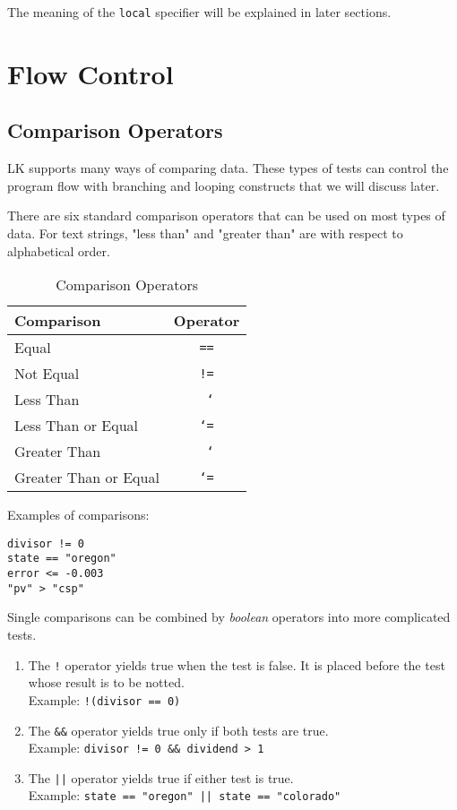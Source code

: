 \documentclass{article}
\newcommand\lt{\char`\<}
\newcommand\gt{\char`\>}
\begin{document}
The meaning of the \texttt{local} specifier will be explained in later sections.



\section{Flow Control}

\subsection{Comparison Operators}

LK supports many ways of comparing data.  These types of tests can control the program flow with branching and looping constructs that we will discuss later.

There are six standard comparison operators that can be used on most types of data.  For text strings, "less than" and "greater than" are with respect to alphabetical order.

\begin{table}[ht]
\begin{center}
\begin{tabular}{lc}
Comparison & Operator\\
\hline
Equal & \texttt{ == } \\
Not Equal & \texttt{ != }  \\
Less Than & \texttt{ \lt }  \\
Less Than or Equal & \texttt{ \lt= } \\
Greater Than & \texttt{ \gt } \\
Greater Than or Equal & \texttt{ \gt= } \\
\end{tabular}
\caption{Comparison Operators}
\label{tab_compop}
\end{center}
\end{table}

Examples of comparisons:

\begin{verbatim}
divisor != 0
state == "oregon"
error <= -0.003
"pv" > "csp"
\end{verbatim}

Single comparisons can be combined by \emph{boolean} operators into more complicated tests.

\begin{enumerate}
\item The \texttt{!} operator yields true when the test is false.  It is placed before the test whose result is to be notted.\\Example: \texttt{!(divisor == 0)}
\item The \texttt{\&\&} operator yields true only if both tests are true.\\Example: \texttt{divisor != 0 \&\& dividend > 1}
\item The \texttt{||} operator yields true if either test is true.\\Example: \texttt{state == "oregon" || state == "colorado"}
\end{enumerate}
\end{document}
